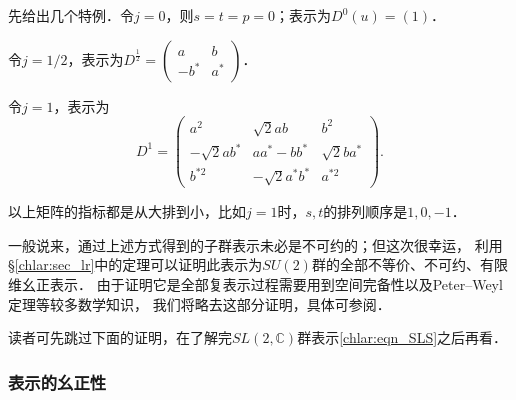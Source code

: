 先给出几个特例．令$j=0$，则$s=t=p=0$；表示为$D^{0}(u)=(1)$．

令$j=1/2$，表示为$D^{\frac{1}{2}}=\begin{pmatrix}a & b \\ -b^* & a^* \end{pmatrix}$．

令$j=1$，表示为
\begin{equation*}
	D^{1}=\begin{pmatrix}    a^2 & \sqrt{2} a b & b^2 \\
		-\sqrt{2} a b^* & a a^*-b b^* & \sqrt{2} b a^* \\
		b^{*2} & -\sqrt{2} a^* b^* & a^{*2}
	\end{pmatrix} .
\end{equation*}

以上矩阵的指标都是从大排到小，比如$j=1$时，$s,t$的排列顺序是$1,0,-1$．







一般说来，通过上述方式得到的子群表示未必是不可约的；但这次很幸运，
利用\S\ref{chlar:sec_lr}中的定理可以证明此表示为$SU(2)$群的全部不等价、不可约、有限维幺正表示．
由于证明它是全部复表示过程需要用到空间完备性以及Peter--Weyl定理等较多数学知识，
我们将略去这部分证明，具体可参阅\parencite[\S 6.6.4]{qiuws-2011}．

读者可先跳过下面的证明，在了解完$SL(2,\mathbb{C})$群表示\eqref{chlar:eqn_SLS}之后再看．

\subsubsection{表示的幺正性}

